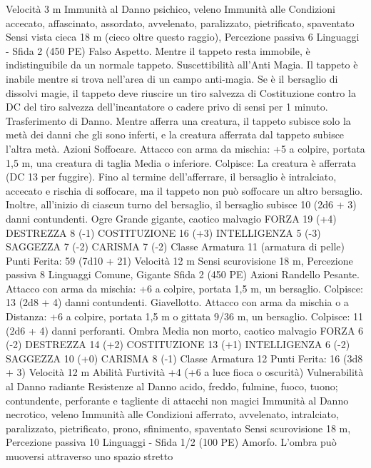 \begin{multicols}{2}
Velocità 3 m
Immunità al Danno psichico, veleno
Immunità alle Condizioni accecato, affascinato, assordato,
avvelenato, paralizzato, pietrificato, spaventato
Sensi vista cieca 18 m (cieco oltre questo raggio), Percezione
passiva 6
Linguaggi -
Sfida 2 (450 PE)
Falso Aspetto. Mentre il tappeto resta immobile, è indistinguibile
da un normale tappeto.
Suscettibilità all’Anti Magia. Il tappeto è inabile mentre si trova
nell’area di un campo anti-magia. Se è il bersaglio di dissolvi
magie, il tappeto deve riuscire un tiro salvezza di Costituzione
contro la DC del tiro salvezza dell’incantatore o cadere privo di
sensi per 1 minuto.
Trasferimento di Danno. Mentre afferra una creatura, il tappeto
subisce solo la metà dei danni che gli sono inferti, e la creatura
afferrata dal tappeto subisce l’altra metà.
Azioni
Soffocare. Attacco con arma da mischia: +5 a colpire, portata
1,5 m, una creatura di taglia Media o inferiore.
Colpisce: La creatura è afferrata (DC 13 per fuggire). Fino al
termine dell’afferrare, il bersaglio è intralciato, accecato e rischia
di soffocare, ma il tappeto non può soffocare un altro bersaglio.
Inoltre, all’inizio di ciascun turno del bersaglio, il bersaglio
subisce 10 (2d6 + 3) danni contundenti.
Ogre
Grande gigante, caotico malvagio
FORZA 19 (+4)
DESTREZZA 8 (-1)
COSTITUZIONE 16 (+3)
INTELLIGENZA 5 (-3)
SAGGEZZA 7 (-2)
CARISMA 7 (-2)
Classe Armatura 11 (armatura di pelle)
\hspace*{0pt}\hfill{Punti Ferita}: 59 (7d10 + 21)
Velocità 12 m
Sensi scurovisione 18 m, Percezione passiva 8
Linguaggi Comune, Gigante
Sfida 2 (450 PE)
Azioni
Randello Pesante. Attacco con arma da mischia: +6 a colpire,
portata 1,5 m, un bersaglio.
Colpisce: 13 (2d8 + 4) danni contundenti.
Giavellotto. Attacco con arma da mischia o a Distanza: +6 a
colpire, portata 1,5 m o gittata 9/36 m, un bersaglio.
Colpisce: 11 (2d6 + 4) danni perforanti.
Ombra
Media non morto, caotico malvagio
FORZA 6 (-2)
DESTREZZA 14 (+2)
COSTITUZIONE 13 (+1)
INTELLIGENZA 6 (-2)
SAGGEZZA 10 (+0)
CARISMA 8 (-1)
Classe Armatura 12
\hspace*{0pt}\hfill{Punti Ferita}: 16 (3d8 + 3)
Velocità 12 m
Abilità Furtività +4 (+6 a luce fioca o oscurità)
Vulnerabilità al Danno radiante
Resistenze al Danno acido, freddo, fulmine, fuoco, tuono;
contundente, perforante e tagliente di attacchi non magici
Immunità al Danno necrotico, veleno
Immunità alle Condizioni afferrato, avvelenato, intralciato,
paralizzato, pietrificato, prono, sfinimento, spaventato
Sensi scurovisione 18 m, Percezione passiva 10
Linguaggi -
Sfida 1/2 (100 PE)
Amorfo. L’ombra può muoversi attraverso uno spazio stretto

\end{multicols}
